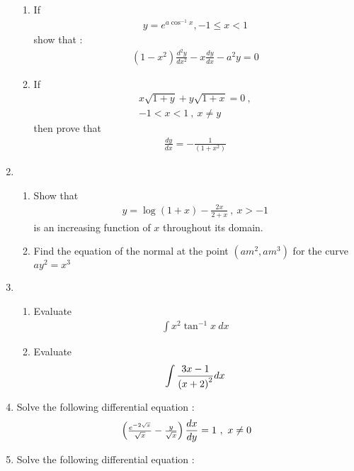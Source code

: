 \documentclass[journal,12pt,twocolumn]{IEEEtran}
\renewcommand\thesection{\arabic{section}}
\begin{document}
\begin{enumerate}[label=\thesection.\arabic*.,ref=\thesection.\theenumi]
\begin{enumerate}
\item If 
\begin{align}
    y = e^{a \cos^{-1}x}, -1 \leq x < 1 \nonumber
\end{align}show that  :
\begin{align}
(1-x^{2})\frac{d^{2}y}{dx^{2}}- x \frac{dy}{dx}-a^{2}y=0 \nonumber
\end{align}
\item If 
\begin{align}
x\sqrt{1+y}+y\sqrt{1+x}=0\ , \nonumber\\ -1<x<1 \ , \ x\neq y \nonumber 
\end{align}
then prove that 
\begin{align}
\frac{dy}{dx}=-\frac{1}{(1+x^{2})} \nonumber
\end{align}
\end{enumerate}
\item \begin{enumerate}
\item Show that 
\begin{align}
y = \log(1+x)-\frac{2x}{2+x} \ , \ x>-1    \nonumber
\end{align}
 is an increasing function of $x$ throughout its domain.\\
\item Find the equation of the normal at the point $(am^{2}, am^{3})$ for the curve $ay^{2} = x^{3}$ \\
\end{enumerate}
\item \begin{enumerate}
\item Evaluate\\
\begin{align}
\int x^{2}\tan^{-1}x\ dx \nonumber
\end{align}
\item Evaluate \\
\begin{align}
\int \frac{3x-1}{\left(x+2\right)^{2}}dx \nonumber
\end{align}
\end{enumerate}
\item Solve the following differential equation : \\
\begin{align}
\begin{pmatrix}\frac{e^{-2\sqrt{x}}}{\sqrt{x}}-\frac{y}{\sqrt{x}}\end{pmatrix}\frac{dx}{dy}= 1 \ , \ x\neq 0 \nonumber
\end{align}
\item Solve the following differential equation : \\

\end{enumerate}
\end{document}
